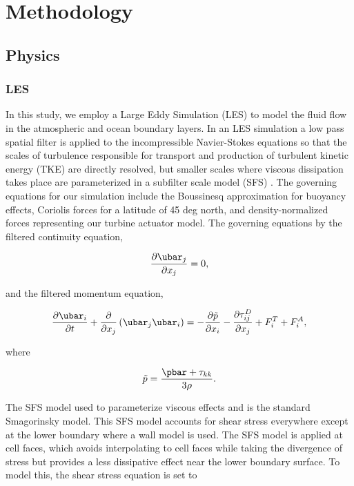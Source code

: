 \section{Methodology}

\subsection{Physics}


\subsubsection{LES}
In this study, we employ a Large Eddy Simulation (LES) to model the fluid flow in the atmospheric and ocean boundary layers.  In an LES simulation a low pass spatial filter is applied to the incompressible Navier-Stokes equations so that the scales of turbulence responsible for transport and production of turbulent kinetic energy (TKE) are directly resolved, but smaller scales where viscous dissipation takes place are parameterized in a subfilter scale model (SFS) \cite{moeng_large-eddy-simulation_1984}.  The governing equations for our simulation include the Boussinesq approximation for buoyancy effects, Coriolis forces for a latitude of 45 deg north, and density-normalized forces representing our turbine actuator model.  The governing equations by the filtered continuity equation,

\begin{equation}
   \label{filtered_continuity}
   \frac{\partial \ubar_j}{\partial x_j} = 0,
\end{equation}

and the filtered momentum equation,

\begin{equation}
   \label{filtered_momentum}
   \frac{\partial \ubar_i}{\partial t} + \frac{\partial}{\partial x_j}\left(\ubar_j \ubar_i \right)
   = - \frac{\partial \tilde{p}}{\partial x_i} - \frac{\partial \tau^D_{ij}}{\partial x_j} + F^T_i + F^A_i,
\end{equation}

where

\begin{equation}
   \label{eq:modified_pressure}
   \tilde{p} = \frac{\pbar + \tau_{kk}}{3 \rho}.
\end{equation}

The SFS model used to parameterize viscous effects and is the standard Smagorinsky model.  This SFS model accounts for shear stress everywhere except at the lower boundary where a wall model is used.  The SFS model is applied at cell faces, which avoids interpolating to cell faces while taking the divergence of stress but provides a less dissipative effect near the lower boundary surface.  To model this, the shear stress equation is set to

